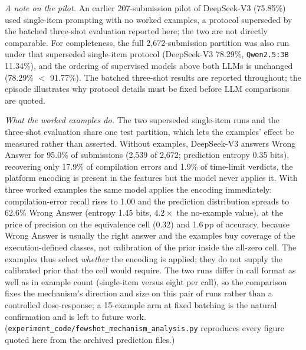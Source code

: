 \documentclass[acmsmall]{acmart}
\begin{document}
\textit{A note on the pilot.} An earlier 207-submission pilot of DeepSeek-V3
(75.85\%) used single-item prompting with no worked examples, a protocol
superseded by the batched three-shot evaluation reported here; the two are not
directly comparable. For completeness, the full 2,672-submission partition was
also run under that superseded single-item protocol (DeepSeek-V3 78.29\%,
\texttt{Qwen2.5:3B} 11.34\%), and the ordering of supervised models above both
LLMs is unchanged (78.29\% $<$ 91.77\%). The batched three-shot results are
reported throughout; the episode illustrates why protocol details must be
fixed before LLM comparisons are quoted.

\textit{What the worked examples do.} The two superseded single-item runs and
the three-shot evaluation share one test partition, which lets the examples'
effect be measured rather than asserted. Without examples, DeepSeek-V3 answers
Wrong Answer for 95.0\% of submissions (2,539 of 2,672; prediction entropy
0.35 bits), recovering only 17.9\% of compilation errors and 1.9\% of
time-limit verdicts, the platform encoding is present in the features but the
model never applies it. With three worked examples the same model applies the
encoding immediately: compilation-error recall rises to 1.00 and the
prediction distribution spreads to 62.6\% Wrong Answer (entropy 1.45 bits,
$4.2\times$ the no-example value), at the price of precision on the
equivalence cell (0.32) and 1.6\,pp of accuracy, because Wrong Answer is
usually the right answer and the examples buy coverage of the
execution-defined classes, not calibration of the prior inside the all-zero
cell. The examples thus select \emph{whether} the encoding is applied; they do
not supply the calibrated prior that the cell would require. The two runs
differ in call format as well as in example count (single-item versus eight
per call), so the comparison fixes the mechanism's direction and size on this
pair of runs rather than a controlled dose-response; a 15-example arm at fixed
batching is the natural confirmation and is left to future work.
(\texttt{experiment\_code/fewshot\_mechanism\_analysis.py} reproduces every
figure quoted here from the archived prediction files.)
\end{document}
